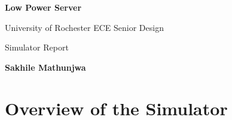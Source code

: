 \documentclass[letterpaper, 11pt, twoside]{article}
\begin{document}
\begin{titlepage}
	\begin{center}

	\vspace*{1cm}
	\Huge
	\textbf{Low Power Server}

	\vspace{0.5cm}
	\LARGE
	University of Rochester ECE Senior Design 

	\vspace{1cm}
	\LARGE
	Simulator Report
	\vspace{1.5cm}
	
	\textbf{Sakhile Mathunjwa} 
	\vfill
	
	
	\end{center}
\end{titlepage}
\clearpage

\tableofcontents

\clearpage

\section[Overview]{Overview of the Simulator}
\subsection{}
\end{document}
